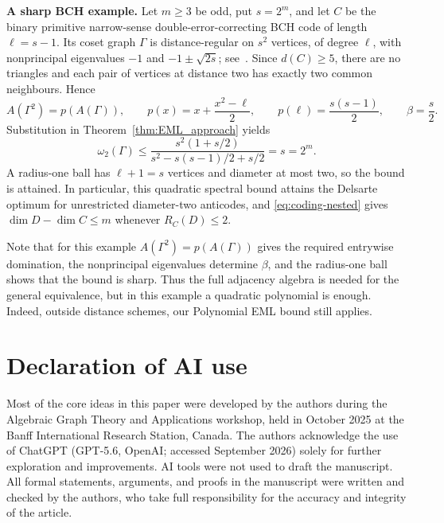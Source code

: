 \documentclass[11pt]{article}
\theoremstyle{plain}
\numberwithin{equation}{section}
\begin{document}
\medskip
\textbf{A sharp BCH example.}
Let $m\ge3$ be odd, put $s=2^m$, and let $C$ be the binary primitive
narrow-sense double-error-correcting BCH code of length $\ell=s-1$.
Its coset graph $\Gamma$ is distance-regular on $s^2$ vertices, of degree
$\ell$, with nonprincipal eigenvalues
$-1$ and $-1\pm\sqrt{2s}$; see~\cite{vanDam_FonderFlaass_2000}.
Since $d(C)\ge5$, there are no triangles and each pair of vertices at
distance two has exactly two common neighbours. Hence
\[
 A(\Gamma^2)=p(A(\Gamma)),\qquad
 p(x)=x+\frac{x^2-\ell}{2},\qquad
 p(\ell)=\frac{s(s-1)}2,\qquad \beta=\frac s2.
\]
Substitution in Theorem~\ref{thm:EML_approach} yields
\begin{equation}\label{eq:coding-bch}
 \omega_2(\Gamma)\le
 \frac{s^2(1+s/2)}{s^2-s(s-1)/2+s/2}=s=2^m.
\end{equation}
A radius-one ball has $\ell+1=s$ vertices and diameter at most two, so
the bound is attained. In particular, this quadratic spectral bound attains the Delsarte optimum for unrestricted diameter-two
anticodes, and \eqref{eq:coding-nested} gives
$\dim D-\dim C\le m$ whenever $R_C(D)\le2$.



Note that for this example $A(\Gamma^2)=p(A(\Gamma))$ gives the required entrywise domination, the nonprincipal eigenvalues determine $\beta$, and the radius-one ball shows that the bound is sharp. Thus the full adjacency algebra is needed for the general equivalence, but in this example a quadratic polynomial is enough. Indeed, outside distance schemes, our Polynomial EML bound still applies.%


 
\section*{Declaration of AI use}
Most of the core ideas in this paper were developed by the authors during the Algebraic Graph Theory and Applications workshop, held in  
October 2025 at the 
Banff International Research Station, Canada. The authors acknowledge the use of ChatGPT (GPT-5.6, OpenAI; accessed September 2026) solely for further exploration and improvements. AI tools were not used to draft the manuscript. All formal statements, arguments, and proofs in the manuscript were written and checked by the authors, who take full responsibility for the accuracy and integrity of the article. 
\end{document}
